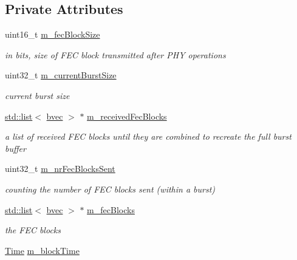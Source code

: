 \subsection*{Private Attributes}
\begin{DoxyCompactItemize}
\item 
uint16\+\_\+t \hyperlink{classns3_1_1SimpleOfdmWimaxPhy_af3ac909865bf5afa9a68c4b17b0313a3}{m\+\_\+fec\+Block\+Size}
\begin{DoxyCompactList}\small\item\em in bits, size of F\+EC block transmitted after P\+HY operations \end{DoxyCompactList}\item 
uint32\+\_\+t \hyperlink{classns3_1_1SimpleOfdmWimaxPhy_ad010bd0c35066302481c613b362809c9}{m\+\_\+current\+Burst\+Size}
\begin{DoxyCompactList}\small\item\em current burst size \end{DoxyCompactList}\item 
\hyperlink{openflow-interface_8h_afd9bcfa176617760671b67580f536fa7}{std\+::list}$<$ \hyperlink{namespacens3_a184f2682613716e1a24969b3e70b4242}{bvec} $>$ $\ast$ \hyperlink{classns3_1_1SimpleOfdmWimaxPhy_ab49fe9b381b1d96514209004f8b80346}{m\+\_\+received\+Fec\+Blocks}
\begin{DoxyCompactList}\small\item\em a list of received F\+EC blocks until they are combined to recreate the full burst buffer \end{DoxyCompactList}\item 
uint32\+\_\+t \hyperlink{classns3_1_1SimpleOfdmWimaxPhy_afe15245d52625d1c993dc3ac7fde60ee}{m\+\_\+nr\+Fec\+Blocks\+Sent}
\begin{DoxyCompactList}\small\item\em counting the number of F\+EC blocks sent (within a burst) \end{DoxyCompactList}\item 
\hyperlink{openflow-interface_8h_afd9bcfa176617760671b67580f536fa7}{std\+::list}$<$ \hyperlink{namespacens3_a184f2682613716e1a24969b3e70b4242}{bvec} $>$ $\ast$ \hyperlink{classns3_1_1SimpleOfdmWimaxPhy_a921e235788fdd0b13036fcea9ee2b2c0}{m\+\_\+fec\+Blocks}
\begin{DoxyCompactList}\small\item\em the F\+EC blocks \end{DoxyCompactList}\item 
\hyperlink{classns3_1_1Time}{Time} \hyperlink{classns3_1_1SimpleOfdmWimaxPhy_ae87e2a7a2406f824acb988537520b1b7}{m\+\_\+block\+Time}

\end{DoxyCompactItemize}
